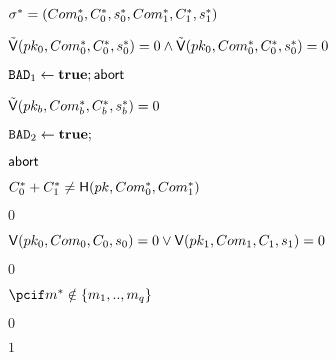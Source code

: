 \begin{figure}[htb!]
{{\begin{minipage}[t]{1\textwidth}
\begin{nicodemus}
                \item \pcparse $\sigma^* = (Com_0^*,C_0^*,s_0^*, Com_1^*, C_1^*,s_1^*)$
                \item \pcif $\tilde{\mathsf{V}}(pk_0,Com^*_0,C^*_0,s^*_0) = 0 \land \tilde{\mathsf{V}}(pk_0,Com^*_0,C^*_0,s^*_0) = 0$
                 \hfill{}
                \item \pcthen $\texttt{BAD}_1 \leftarrow \textbf{true};\mathsf{abort}$
                 \hfill{}
                 \item \pcif $\tilde{\mathsf{V}}(pk_b,Com^*_b,C^*_b,s^*_b) = 0$
                 \hfill{}
                 \item \pcthen $\texttt{BAD}_2 \leftarrow \textbf{true};$
                  \hfill{}
                 \item \quad $\mathsf{abort}$
                  \hfill{}
            	\item \pcif $C_0^*+C_1^* \neq \mathsf{H}(pk,Com^*_0,Com^*_1) $
		\item \quad \pcthen \pcreturn $0$
		\item \pcif $\mathsf{V}(pk_0,Com_0,C_0,s_0) = 0 \lor \mathsf{V}(pk_1,Com_1,C_1,s_1) =0$
		\item \quad \pcthen \pcreturn $0$
		 \item $\pcif m^* \notin \{m_1,..,m_q\} $
		 \item \quad \pcthen \pcreturn $0$
		\item \pcelse \pcreturn $1$
                

            \end{nicodemus}
        \end{minipage}
                      
    }}
    \caption{}
    \label{fig:x-soundess}
\end{figure}


